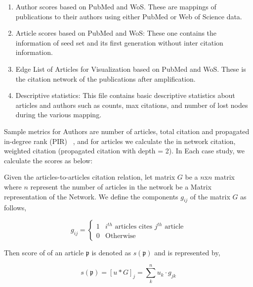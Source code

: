 \documentclass[review]{elsarticle}
\begin{document}
\begin{enumerate}
  \item Author scores based on PubMed and WoS. These are mappings of publications to their authors using either PubMed or Web of Science data. 
  \item Article scores based on PubMed and WoS: These one  contains the information of seed set and its first generation without inter citation information.
  \item Edge List of Articles for Visualization based on PubMed and WoS. These is the citation network of the publications after amplification.
  \item Descriptive statistics: This file contains  basic descriptive statistics about articles and authors such as counts, max citations, and number of lost nodes during the various mapping. 
\end{enumerate}

Sample metrics for Authors are number of articles, total citation and propagated in-degree rank (PIR) ~\cite{Williams2015}, and for articles we calculate the in network citation, weighted citation (propagated citation with depth = 2). In Each case study,  we calculate the scores as below:

Given the articles-to-articles citation relation, let matrix $G$ be a $n$x$n$ matrix where $n$ represent the number of articles in the network be a Matrix representation of the Network. We define 
the components $g_{ij}$ of the matrix $G$ as follows,

\begin{equation*}
g_{ij} = \begin{cases}
1 &\text{$i^{th}$ articles cites $j^{th}$ article}\\
0 &\text{Otherwise}
\end{cases}
\end{equation*}

Then score of of an article  $\mathfrak{p}$ is denoted as $s(\mathfrak{p})$ and is represented by,

\begin{equation*}
s(\mathfrak{p}) = [u*G]_{j} = \sum_k^n  u_k \cdot g_{jk}
\end{equation*}
\end{document}
